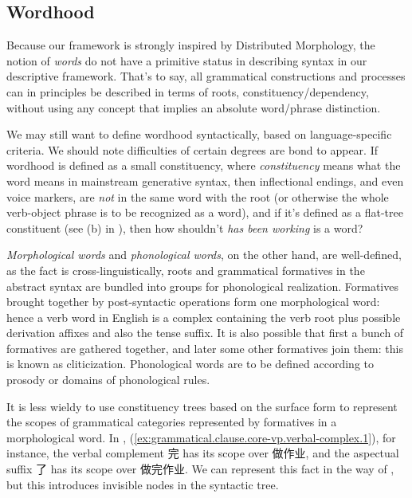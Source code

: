 \documentclass[UTF8, a4paper, oneside, scheme=plain, 12pt]{ctexrep}
\newcommand*{\term}[1]{\emph{#1}}
\newcommand{\form}[1]{\emph{#1}}
\begin{document}
{\subsection{Wordhood}\label{sec:intro.theory.word}

Because our framework is strongly inspired by Distributed Morphology,
the notion of \term{words} do not have a primitive status
in describing syntax in our descriptive framework.
That's to say, all grammatical constructions and processes
can in principles be described in terms of roots, constituency/dependency,
without using any concept that implies an absolute word/phrase distinction.

We may still want to define wordhood syntactically,
based on language-specific criteria.
We should note difficulties of certain degrees are bond to appear.
If wordhood is defined as a small constituency, where \term{constituency} means what the word means in mainstream generative syntax,
then inflectional endings, and even voice markers,
are \emph{not} in the same word with the root
(or otherwise the whole verb-object phrase is to be recognized as a word),
and if it's defined as a flat-tree constituent (see (b) in ),
then how shouldn't \form{has been working} is a word?

\emph{Morphological words} and \emph{phonological words},
on the other hand, are well-defined, as the fact is cross-linguistically,
roots and grammatical formatives in the abstract syntax are bundled into groups for phonological realization.
Formatives brought together by post-syntactic operations form one morphological word:
hence a verb word in English is a complex containing
the verb root plus possible derivation affixes and also the tense suffix.
It is also possible that first a bunch of formatives are gathered together,
and later some other formatives join them:
this is known as cliticization.
Phonological words are to be defined according to prosody
or domains of phonological rules.

It is less wieldy to use constituency trees based on the surface form to represent 
the scopes of grammatical categories represented by formatives
in a morphological word.
In , (\ref{ex:grammatical.clause.core-vp.verbal-complex.1}),
for instance, the verbal complement 完 has its scope over 做作业,
and the aspectual suffix 了 has its scope over 做完作业.
We can represent this fact in the way of ,
but this introduces invisible nodes in the syntactic tree. 

}
\end{document}
